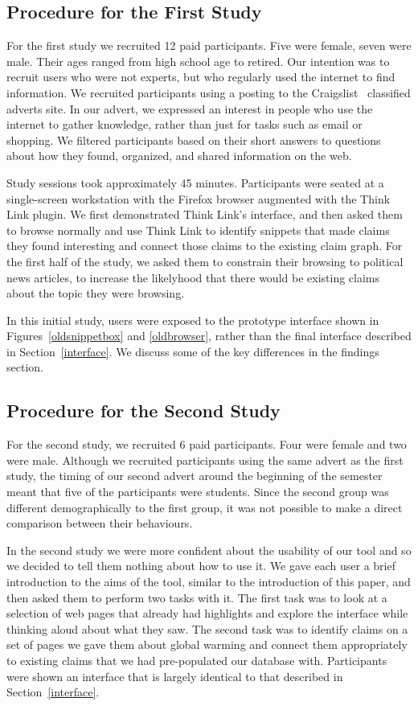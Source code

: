 \documentclass{chi2009}
\begin{document}
\subsection{Procedure for the First Study}

For the first study we recruited 12 paid participants. Five were female, seven were male. Their ages ranged from high school age to retired. Our intention was to recruit users who were not experts, but who regularly used the internet to find information. We recruited participants using a posting to the Craigslist~\cite{craigslist} classified adverts site. In our advert, we expressed an interest in people who use the internet to gather knowledge, rather than just for tasks such as email or shopping. We filtered participants based on their short answers to questions about how they found, organized, and shared information on the web. 

Study sessions took approximately 45 minutes. Participants were seated at a single-screen workstation with the Firefox browser augmented with the Think Link plugin. We first demonstrated Think Link's interface, and then asked them to browse normally and use Think Link to identify snippets that made claims they found interesting and connect those claims to the existing claim graph. For the first half of the study, we asked them to constrain their browsing to political news articles, to increase the likelyhood that there would be existing claims about the topic they were browsing.

In this initial study, users were exposed to the prototype interface shown in Figures~\ref{oldsnippetbox} and \ref{oldbrowser}, rather than the final interface described in Section~\ref{interface}. We discuss some of the key differences in the findings section.

\subsection{Procedure for the Second Study}

For the second study, we recruited 6 paid participants. Four were female and two were male. Although we recruited participants using the same advert as the first study, the timing of our second advert around the beginning of the semester meant that five of the participants were students. Since the second group was different demographically to the first group, it was not possible to make a direct comparison between their behaviours. 

In the second study we were more confident about the usability of our tool and so we decided to tell them nothing about how to use it. We gave each user a brief introduction to the aims of the tool, similar to the introduction of this paper, and then asked them to perform two tasks with it. The first task was to look at a selection of web pages that already had highlights and explore the interface while thinking aloud about what they saw. The second task was to identify claims on a set of pages we gave them about global warming and connect them appropriately to existing claims that we had pre-populated our database with. Participants were shown an interface that is largely identical to that described in Section~\ref{interface}. 
\end{document}
